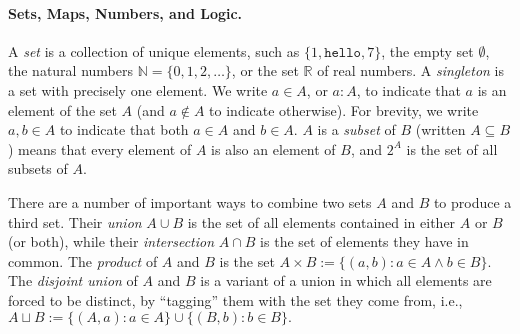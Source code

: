     \label{ref:prelim-basic}

\paragraph{Sets, Maps, Numbers, and Logic.}
A \emph{set} is a collection of unique elements, 
    such as 
    $\{1, \texttt{hello}, 7\}$,
    the empty set $\emptyset$, 
    the natural numbers $\mathbb N = \{0, 1, 2, \ldots \}$,
    or the set $\mathbb R$ of real numbers. 
A \emph{singleton} is a set with precisely one element. 
We write $a \in A$, or $a : A$, 
    to indicate that $a$ is an element of the set $A$
    (and $a \notin A$ to indicate otherwise).
For brevity, we write $a,b \in A$ to indicate that both $a \in A$ and $b \in A$. 
$A$ is a \emph{subset} of $B$ (written $A \subseteq B$) means that every element of $A$ is also an element of $B$, and $2^A$ is the set of all subsets of $A$.

There are a number of important ways to combine two sets $A$ and $B$ to produce a third set.  
Their \emph{union} $A \cup B$ is the set of all elements contained in either $A$ or $B$ (or both),
while their \emph{intersection} 
$A \cap B$ is the set of elements they have in common.
The \emph{product} of $A$ and $B$ is the set $A \times B := \{ (a,b) : a \in A \land b \in B\}$. 
The \emph{disjoint union} of $A$ and $B$ is a variant of a union in which all elements are forced to be distinct, by ``tagging'' them with the set they come from, i.e., 
$
    A \sqcup B := \{ (A, a) : a \in A \} \cup \{ (B, b) : b \in B \}. 
$
%

